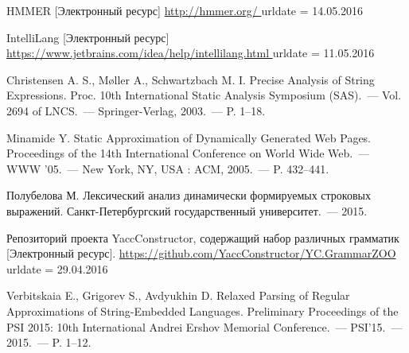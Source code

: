 \begin{thebibliography}{99}
  HMMER [Электронный ресурс]
  \url{http://hmmer.org/ }
  urldate = {14.05.2016}




    
  IntelliLang [Электронный ресурс]
  \url{ https://www.jetbrains.com/idea/help/intellilang.html }
  urldate = {11.05.2016}
                        
                                             
  Christensen A. S., M{\o}ller A., Schwartzbach M. I.
  Precise Analysis of String Expressions.
   Proc. 10th International Static Analysis Symposium (SAS).~--- Vol. 2694 of LNCS.~--- Springer-Verlag, 2003.~--- P. 1–18.

  Minamide Y. 
  Static Approximation of Dynamically Generated Web Pages.
  Proceedings of the 14th International Conference on World Wide Web.~--- WWW ’05.~--- New York, NY, USA : ACM, 2005.~--- P. 432–441.
                                         
  Полубелова М. 
  Лексический анализ динамически формируемых строковых выражений.
  Санкт-Петербургский государственный университет.~--- 2015.
  

  Репозиторий проекта YaccConstructor, содержащий набор различных грамматик [Электронный ресурс].
  \url{https://github.com/YaccConstructor/YC.GrammarZOO}
  urldate = {29.04.2016}

  Verbitskaia E., Grigorev S., Avdyukhin D. 
  Relaxed Parsing of Regular Approximations of String-Embedded Languages.
  Preliminary Proceedings of the PSI 2015: 10th International Andrei Ershov Memorial Conference.~--- PSI’15.~--- 2015.~--- P. 1–12.


\end{thebibliography}
